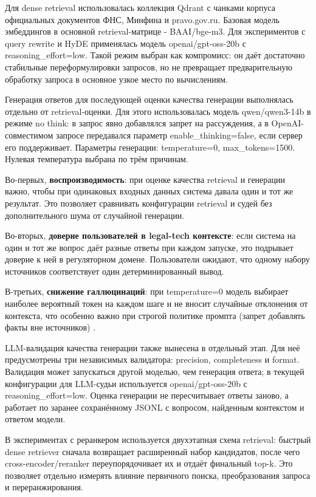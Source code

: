 \documentclass[a4paper,12pt]{article}
\begin{document}
Для dense retrieval использовалась коллекция Qdrant с чанками корпуса официальных документов ФНС, Минфина и pravo.gov.ru. Базовая модель эмбеддингов в основной retrieval-матрице - BAAI/bge-m3. Для экспериментов с query rewrite и HyDE применялась модель openai/gpt-oss-20b с reasoning\_effort=low. Такой режим выбран как компромисс: он даёт достаточно стабильные переформулировки запросов, но не превращает предварительную обработку запроса в основное узкое место по вычислениям.

Генерация ответов для последующей оценки качества генерации выполнялась отдельно от retrieval-оценки. Для этого использовалась модель qwen/qwen3-14b в режиме no think: в запрос явно добавлялся запрет на рассуждения, а в OpenAI-совместимом запросе передавался параметр enable\_thinking=false, если сервер его поддерживает. Параметры генерации: temperature=0, max\_tokens=1500. Нулевая температура выбрана по трём причинам.

Во-первых, \textbf{воспроизводимость}: при оценке качества retrieval и генерации важно, чтобы при одинаковых входных данных система давала один и тот же результат. Это позволяет сравнивать конфигурации retrieval и судей без дополнительного шума от случайной генерации.

Во-вторых, \textbf{доверие пользователей в legal-tech контексте}: если система на один и тот же вопрос даёт разные ответы при каждом запуске, это подрывает доверие к ней в регуляторном домене. Пользователи ожидают, что одному набору источников соответствует один детерминированный вывод.

В-третьих, \textbf{снижение галлюцинаций}: при temperature=0 модель выбирает наиболее вероятный токен на каждом шаге и не вносит случайные отклонения от контекста, что особенно важно при строгой политике промпта (запрет добавлять факты вне источников) \cite{ji2023hallucination}.

LLM-валидация качества генерации также вынесена в отдельный этап. Для неё предусмотрены три независимых валидатора: precision, completeness и format. Валидация может запускаться другой моделью, чем генерация ответа; в текущей конфигурации для LLM-судьи используется openai/gpt-oss-20b с reasoning\_effort=low. Оценка генерации не пересчитывает ответы заново, а работает по заранее сохранённому JSONL с вопросом, найденным контекстом и ответом модели.

В экспериментах с реранкером используется двухэтапная схема retrieval: быстрый dense retriever сначала возвращает расширенный набор кандидатов, после чего cross-encoder/reranker переупорядочивает их и отдаёт финальный top-k. Это позволяет отдельно измерять влияние первичного поиска, преобразования запроса и переранжирования.
\end{document}
